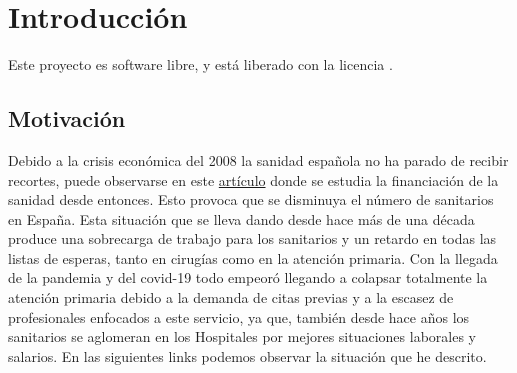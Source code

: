 \chapter{Introducción}

Este proyecto es software libre, y está liberado con la licencia \cite{gplv3}.

\section{Motivación}
Debido a la crisis económica del 2008 la sanidad española no ha parado de recibir recortes, puede observarse en este
\href{https://www.consalud.es/politica/decada-recortes-2009-2018-efectos-infrafinanciacion-sanidad_87083_102.html}{artículo} donde
se estudia la financiación de la sanidad desde entonces. Esto provoca que se disminuya el número de sanitarios en España.
Esta situación que se lleva dando desde hace más de una década produce una sobrecarga de trabajo para los sanitarios y un retardo 
en todas las listas de esperas, tanto en cirugías como en la atención primaria. 
Con la llegada de la pandemia y del covid-19 todo empeoró llegando a colapsar totalmente la atención primaria debido a la demanda
de citas previas y a la escasez de profesionales enfocados a este servicio, ya que, también desde hace años los sanitarios se aglomeran
en los Hospitales por mejores situaciones laborales y salarios. En las siguientes links podemos observar la situación que he descrito.
